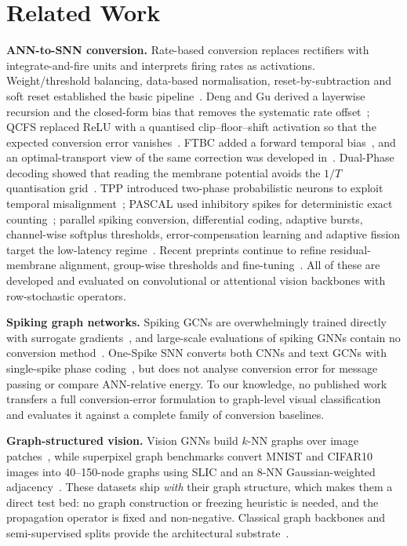 \section{Related Work}
\label{sec:related}

\textbf{ANN-to-SNN conversion.} Rate-based conversion replaces rectifiers with integrate-and-fire units and interprets firing rates as activations. Weight/threshold balancing, data-based normalisation, reset-by-subtraction and soft reset established the basic pipeline~\cite{diehl2015,rueckauer2017,sengupta2019,han2020rmp}. Deng and Gu derived a layerwise recursion and the closed-form bias that removes the systematic rate offset~\cite{deng2021}; QCFS replaced ReLU with a quantised clip--floor--shift activation so that the expected conversion error vanishes~\cite{bu2022qcfs}. FTBC added a forward temporal bias~\cite{wu2024ftbc}, and an optimal-transport view of the same correction was developed in~\cite{bojkovic2024ot}. Dual-Phase decoding showed that reading the membrane potential avoids the $1/T$ quantisation grid~\cite{dualphase2024}. TPP introduced two-phase probabilistic neurons to exploit temporal misalignment~\cite{bojkovic2025tpp}; PASCAL used inhibitory spikes for deterministic exact counting~\cite{ramesh2025pascal}; parallel spiking conversion, differential coding, adaptive bursts, channel-wise softplus thresholds, error-compensation learning and adaptive fission target the low-latency regime~\cite{hao2025parallel,huang2025dcgs,wang2025adafire,yang2025csqcfs,liu2025ecl,jiang2025fission}. Recent preprints continue to refine residual-membrane alignment, group-wise thresholds and fine-tuning~\cite{chen2026rmp,ji2026gtdl,xia2026neuro}. All of these are developed and evaluated on convolutional or attentional vision backbones with row-stochastic operators.

\textbf{Spiking graph networks.} Spiking GCNs are overwhelmingly trained directly with surrogate gradients~\cite{neftci2019,fang2023spikingjelly}, and large-scale evaluations of spiking GNNs contain no conversion method~\cite{sgnnbench2025}. One-Spike SNN converts both CNNs and text GCNs with single-spike phase coding~\cite{hwang2025onespike}, but does not analyse conversion error for message passing or compare ANN-relative energy. To our knowledge, no published work transfers a full conversion-error formulation to graph-level visual classification and evaluates it against a complete family of conversion baselines.

\textbf{Graph-structured vision.} Vision GNNs build $k$-NN graphs over image patches~\cite{han2022vig,knyazev2019}, while superpixel graph benchmarks convert MNIST and CIFAR10 images into 40--150-node graphs using SLIC and an 8-NN Gaussian-weighted adjacency~\cite{dwivedi2023,achanta2012}. These datasets ship \emph{with} their graph structure, which makes them a direct test bed: no graph construction or freezing heuristic is needed, and the propagation operator is fixed and non-negative. Classical graph backbones and semi-supervised splits provide the architectural substrate~\cite{kipf2017,velickovic2018,hamilton2017,yang2016planetoid}.

